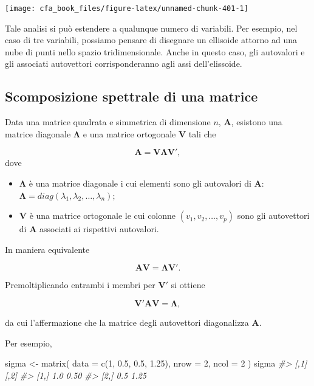 \documentclass[
  11pt,
]{krantz}
\makeatletter
\newenvironment{Shaded}{\begin{snugshade}}{\end{snugshade}}
\newcommand{\AttributeTok}[1]{\textcolor[rgb]{0.61,0.61,0.61}{#1}}
\newcommand{\CommentTok}[1]{\textcolor[rgb]{0.37,0.37,0.37}{\textit{#1}}}
\newcommand{\DecValTok}[1]{\textcolor[rgb]{0.06,0.06,0.06}{#1}}
\newcommand{\FloatTok}[1]{\textcolor[rgb]{0.06,0.06,0.06}{#1}}
\newcommand{\FunctionTok}[1]{\textcolor[rgb]{0,0,0}{#1}}
\newcommand{\NormalTok}[1]{#1}
\newcommand{\OtherTok}[1]{\textcolor[rgb]{0.37,0.37,0.37}{#1}}
\providecommand{\tightlist}{%
  \setlength{\itemsep}{0pt}\setlength{\parskip}{0pt}}
\newenvironment{kframe}{%
\medskip{}
\setlength{\fboxsep}{.8em}
 \def\at@end@of@kframe{}%
 \ifinner\ifhmode%
  \def\at@end@of@kframe{\end{minipage}}%
  \begin{minipage}{\columnwidth}%
 \fi\fi%
 \def\FrameCommand##1{\hskip\@totalleftmargin \hskip-\fboxsep
 \colorbox{shadecolor}{##1}\hskip-\fboxsep
     \hskip-\linewidth \hskip-\@totalleftmargin \hskip\columnwidth}%
 \MakeFramed {\advance\hsize-\width
   \@totalleftmargin\z@ \linewidth\hsize
   \@setminipage}}%
 {\par\unskip\endMakeFramed%
 \at@end@of@kframe}
\renewenvironment{Shaded}{\begin{kframe}}{\end{kframe}}
\theoremstyle{definition}
\theoremstyle{definition}
\theoremstyle{definition}
\theoremstyle{definition}
\theoremstyle{remark}
\makeatother
\begin{document}
\begin{center}\texttt{[image: cfa\_book\_files/figure-latex/unnamed-chunk-401-1]} \end{center}

Tale analisi si può estendere a qualunque numero di variabili. Per esempio, nel caso di tre variabili, possiamo pensare di disegnare un ellisoide attorno ad una nube di punti nello spazio tridimensionale. Anche in questo caso, gli autovalori e gli associati autovettori corrisponderanno agli assi dell'elissoide.

\hypertarget{scomposizione-spettrale-di-una-matrice}{%
\subsection{Scomposizione spettrale di una matrice}\label{scomposizione-spettrale-di-una-matrice}}

Data una matrice quadrata e simmetrica di dimensione \(n\), \(\boldsymbol{A}\), esistono una matrice diagonale \(\boldsymbol{\Lambda}\) e una matrice ortogonale \(\boldsymbol{V}\) tali che

\[\boldsymbol{A} =\boldsymbol{V} \boldsymbol{\Lambda} \boldsymbol{V}',\] dove

\begin{itemize}
\tightlist
\item
  \(\boldsymbol{\Lambda}\) è una matrice diagonale i cui elementi sono gli autovalori di \(\boldsymbol{A}\): \(\boldsymbol{\Lambda} = diag(\lambda_1, \lambda_2,  \dots, \lambda_n)\);
\item
  \(\boldsymbol{V}\) è una matrice ortogonale le cui colonne \((v_1, v_2, \dots, v_p)\) sono gli autovettori di \(\boldsymbol{A}\) associati ai rispettivi autovalori.
\end{itemize}

In maniera equivalente

\[\boldsymbol{A} \boldsymbol{V} =  \boldsymbol{\Lambda} \boldsymbol{V}'.\]

Premoltiplicando entrambi i membri per \(\boldsymbol{V}'\) si ottiene

\[\boldsymbol{V}'\boldsymbol{A} \boldsymbol{V} =
\boldsymbol{\Lambda},\]

da cui l'affermazione che la matrice degli autovettori diagonalizza \(\boldsymbol{A}\).

Per esempio,

\begin{Shaded}
\begin{Highlighting}[]
\NormalTok{sigma }\OtherTok{\textless{}{-}} \FunctionTok{matrix}\NormalTok{(}
  \AttributeTok{data =} \FunctionTok{c}\NormalTok{(}\DecValTok{1}\NormalTok{, }\FloatTok{0.5}\NormalTok{, }\FloatTok{0.5}\NormalTok{, }\FloatTok{1.25}\NormalTok{),}
  \AttributeTok{nrow =} \DecValTok{2}\NormalTok{,}
  \AttributeTok{ncol =} \DecValTok{2}
\NormalTok{)}
\NormalTok{sigma}
\CommentTok{\#\textgreater{}      [,1] [,2]}
\CommentTok{\#\textgreater{} [1,]  1.0 0.50}
\CommentTok{\#\textgreater{} [2,]  0.5 1.25}
\end{Highlighting}
\end{Shaded}
\end{document}
